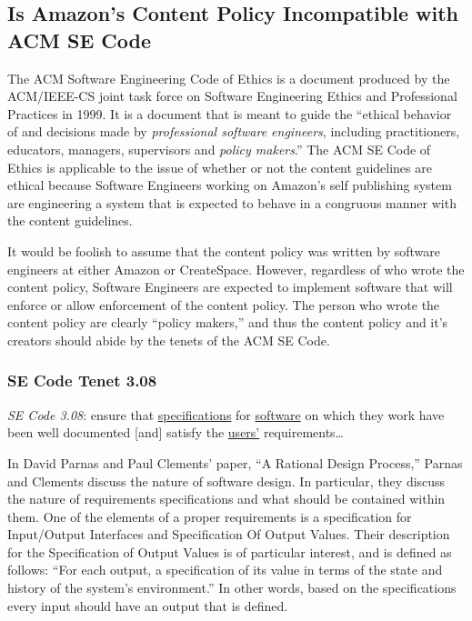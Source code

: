 \documentclass[11pt]{article}
\begin{document}
\begin{multicols}{2}


\subsection{Is Amazon's Content Policy Incompatible with ACM SE Code}

The ACM Software Engineering Code of Ethics is a document produced by the ACM/IEEE-CS joint task force on Software Engineering Ethics and Professional Practices in 1999.  It is a document that is meant to guide the ``ethical behavior of and decisions made by \emph{professional software engineers}, including practitioners, educators, managers, supervisors and \emph{policy makers}.'' \cite[Emphasis Mine]{SECode} The ACM SE Code of Ethics is applicable to the issue of whether or not the content guidelines are ethical because Software Engineers working on Amazon's self publishing system are engineering a system that is expected to behave in a congruous manner with the content guidelines.

It would be foolish to assume that the content policy was written by software engineers at either Amazon or CreateSpace.  However, regardless of who wrote the content policy, Software Engineers are expected to implement software that will enforce or allow enforcement of the content policy.  The person who wrote the content policy are clearly ``policy makers,'' and thus the content policy and it's creators should abide by the tenets of the ACM SE Code.

\subsubsection{SE Code Tenet 3.08}

\emph{SE Code 3.08}: ensure that \underline{specifications} for \underline{software} on which they work have been well documented [and] satisfy the \underline{users'} requirements\ldots 

In David Parnas and Paul Clements' paper, ``A Rational Design Process,'' Parnas and Clements discuss the nature of software design. \cite{fakeit} In particular, they discuss the nature of requirements specifications and what should be contained within them.  One of the elements of a proper requirements is a specification for Input/Output Interfaces and Specification Of Output Values.  Their description for the Specification of Output Values is of particular interest, and is defined as follows: ``For each output, a specification of its value in terms of the state and history of the system's environment.'' \cite{fakeit} In other words, based on the specifications every input should have an output that is defined. 


\end{multicols}
\end{document}
